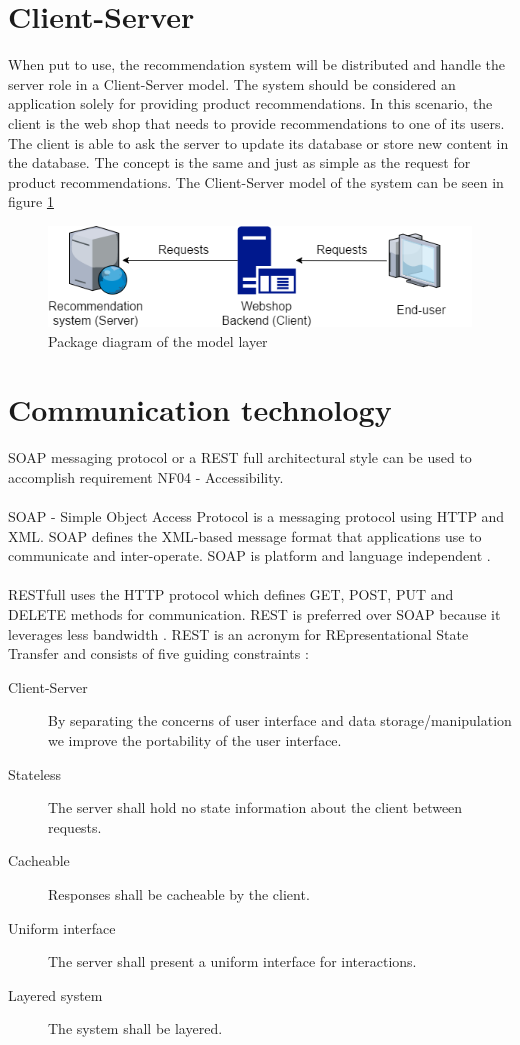 \section{Client-Server}
When put to use, the recommendation system will be distributed and handle the server role in a Client-Server model. The system should be considered an application solely for providing product recommendations. In this scenario, the client is the web shop that needs to provide recommendations to one of its users. The client is able to ask the server to update its database or store new content in the database. The concept is the same and just as simple as the request for product recommendations. The Client-Server model of the system can be seen in figure \ref{fig:ClientServer}

\begin{figure}[H]
	\centering
	\includegraphics[width=.8\linewidth]{Figures/ClientServer.png}
	\caption{Package diagram of the model layer}
	\label{fig:ClientServer}
\end{figure}

\section{Communication technology}
SOAP messaging protocol or a \gls{REST} full architectural style can be used to accomplish requirement NF04 - Accessibility.\\\\ SOAP - Simple Object Access Protocol is a messaging protocol using \gls{HTTP} and \gls{XML}. SOAP defines the \gls{XML}-based message format that applications use to communicate and inter-operate. SOAP is platform and language independent \cite{SOAP}. \\\\ \gls{REST}full uses the \gls{HTTP} protocol which defines GET, POST, PUT and DELETE methods for communication. \gls{REST} is preferred over SOAP because it leverages less bandwidth \cite{restfull}. 
\gls{REST} is an acronym for REpresentational State Transfer and consists of five guiding constraints \cite{rest}:
\begin{description}
\item [Client-Server] By separating the concerns of user interface and data storage/manipulation we improve the portability of the user interface.
\item [Stateless] The server shall hold no state information about the client between requests.
\item [Cacheable] Responses shall be cacheable by the client.
\item [Uniform interface] The server shall present a uniform interface for interactions.
\item [Layered system] The system shall be layered.
\end{description}



